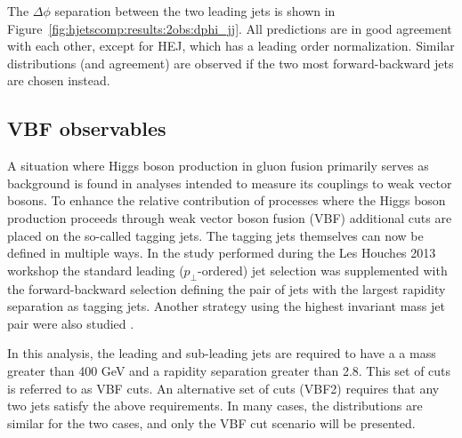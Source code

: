 The $\Delta\phi$ separation between the two leading jets is shown in
Figure~\ref{fig:hjetscomp:results:2obs:dphi_jj}. All predictions are
in good agreement with each other, except for HEJ, which has a leading
order normalization. Similar distributions (and agreement) are
observed if the two most forward-backward jets are chosen instead.



\clearpage
\subsection{VBF observables}
\label{sec:hjetscomp:results:VBFobs}

A situation where Higgs boson production in gluon fusion primarily serves 
as background is found in analyses intended to measure its couplings to weak 
vector bosons. To enhance the relative contribution 
of processes where the Higgs boson production proceeds through weak vector 
boson fusion (VBF) additional cuts are placed on the so-called tagging 
jets. The tagging jets themselves can now be defined in multiple ways. 
In the study performed during the Les Houches 2013 workshop 
\cite{AlcarazMaestre:2012vp} the standard leading ($p_\perp$-ordered) jet 
selection was supplemented with the forward-backward selection defining 
the pair of jets with the largest rapidity separation as tagging jets. 
Another strategy using the highest invariant mass jet pair were also studied 
\cite{Greiner:2015jha}. 

In this analysis, the leading and sub-leading jets are required to have a
a mass greater than 400 GeV and a rapidity separation greater than 2.8. This set 
of cuts is referred to as VBF cuts. An alternative set of cuts (VBF2) requires
that any two jets satisfy the above requirements. In many cases, the distributions
are similar for the two cases, and only the VBF cut scenario will be presented. 


